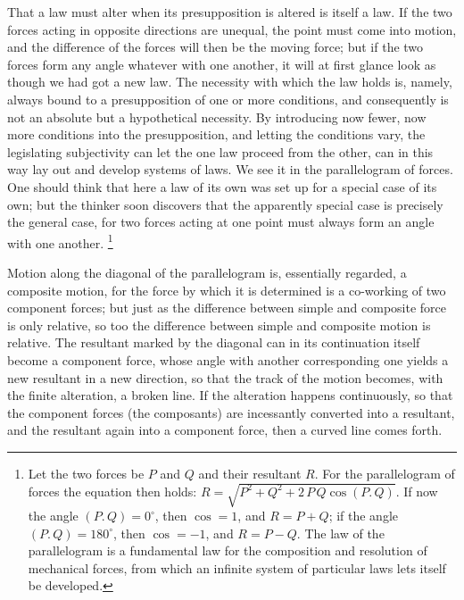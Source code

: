 \documentclass[12pt,a4paper]{book}
\begin{document}
That a law must alter when its presupposition is altered is itself a law. If the two
forces acting in opposite directions are unequal, the point must come into motion,
and the difference of the forces will then be the moving force; but if the two
forces form any angle whatever with one another, it will at first glance look as
though we had got a new law. The necessity with which the law holds is, namely,
always bound to a presupposition of one or more conditions, and consequently is not
an absolute but a hypothetical necessity. By introducing now fewer, now more
conditions into the presupposition, and letting the conditions vary, the legislating
subjectivity can let the one law proceed from the other, can in this way lay out and
develop systems of laws. We see it in the parallelogram of forces. One should think
that here a law of its own was set up for a special case of its own; but the thinker
soon discovers that the apparently special case is precisely the general case, for
two forces acting at one
point must always form an angle with one another.%
\footnote{Let the two forces be $P$ and $Q$ and their resultant $R$. For the
parallelogram of forces the equation then holds:
$R = \sqrt{P^2 + Q^2 + 2\,P\,Q \cos (P.\,Q)}$. If now the angle
$(P.\,Q) = 0^{\circ}$, then $\cos = 1$, and $R = P + Q$; if the angle
$(P.\,Q) = 180^{\circ}$, then $\cos = -1$, and $R = P-Q$. The law of the
parallelogram is a fundamental law for the composition and resolution of mechanical
forces, from which an infinite system of particular laws lets itself be developed.}

Motion along the diagonal of the parallelogram is, essentially regarded, a composite
motion, for the force by which it is determined is a co-working of two component
forces; but just as the difference between simple and composite force is only
relative, so too the difference between simple and composite motion is relative. The
resultant marked by the diagonal can in its continuation itself become a component
force, whose angle with another corresponding one yields a new resultant in a new
direction, so that the track of the motion becomes, with the finite alteration, a
broken line. If the alteration happens continuously, so that the component forces
(the composants) are incessantly converted into a resultant, and the resultant again
into a component force, then a curved line comes forth.
\end{document}
